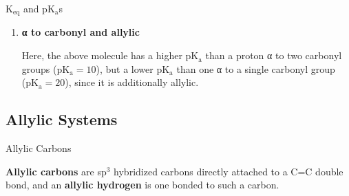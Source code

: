 \begin{core}{K$_\text{eq}$ and pK$_\text{a}$s}
\begin{enumerate}
        \item \textbf{α to carbonyl and allylic}


        Here, the above molecule has a higher pK$_\text{a}$ than a proton α to two carbonyl groups (pK$_\text{a} = 10$), but a lower pK$_\text{a}$ than one α to a single carbonyl group (pK$_\text{a} = 20$), since it is additionally allylic.

      \end{enumerate}

    \end{core}

  \subsection{Allylic Systems}

    \begin{core}{Allylic Carbons}

      \textbf{Allylic carbons} are sp$^3$ hybridized carbons directly attached to a C=C double bond, and an \textbf{allylic hydrogen} is one bonded to such a carbon.


    \end{core}

